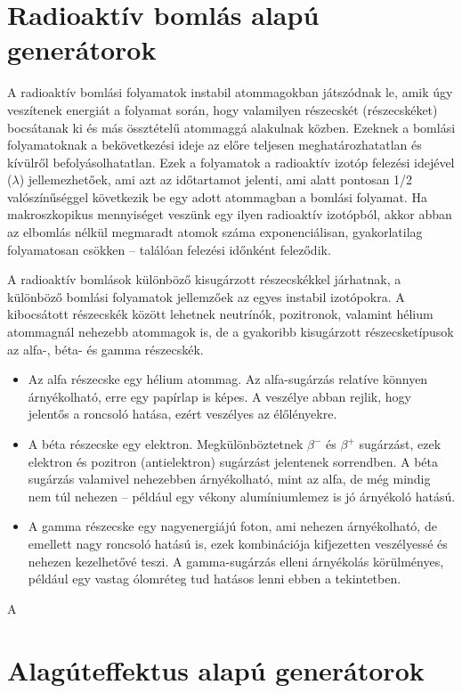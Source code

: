 \documentclass[12pt,a4paper,oneside]{article}
\begin{document}
\section*{Radioaktív bomlás alapú generátorok}
A  radioaktív bomlási folyamatok instabil atommagokban játszódnak le, amik úgy veszítenek energiát a folyamat során, hogy valamilyen részecskét (részecskéket) bocsátanak ki és más össztételű atommaggá alakulnak közben. Ezeknek a bomlási folyamatoknak a bekövetkezési ideje az előre teljesen meghatározhatatlan és kívülről befolyásolhatatlan. Ezek a folyamatok a radioaktív izotóp felezési idejével ($\lambda$) jellemezhetőek, ami azt az időtartamot jelenti, ami alatt pontosan 1/2 valószínűséggel következik be egy adott atommagban a bomlási folyamat. Ha makroszkopikus mennyiséget veszünk egy ilyen radioaktív izotópból, akkor abban az elbomlás nélkül megmaradt atomok száma exponenciálisan, gyakorlatilag folyamatosan csökken -- találóan felezési időnként feleződik.
\par
A radioaktív bomlások különböző kisugárzott részecskékkel járhatnak, a különböző bomlási folyamatok jellemzőek az egyes instabil izotópokra. A kibocsátott részecskék között lehetnek neutrínók, pozitronok, valamint hélium atommagnál nehezebb atommagok is, de a gyakoribb kisugárzott részecsketípusok az alfa-, béta- és gamma részecskék.
\begin{itemize}
	\item Az alfa részecske egy hélium atommag. Az alfa-sugárzás relatíve könnyen árnyékolható, erre egy papírlap is képes. A veszélye abban rejlik, hogy jelentős a roncsoló hatása, ezért veszélyes az élőlényekre.
	\item A béta részecske egy elektron. Megkülönböztetnek $\beta^-$ és $\beta^+$ sugárzást, ezek elektron és pozitron (antielektron) sugárzást jelentenek sorrendben. A béta sugárzás valamivel nehezebben árnyékolható, mint az alfa, de még mindig nem túl nehezen -- például egy vékony alumíniumlemez is jó árnyékoló hatású.
	\item A gamma részecske egy nagyenergiájú foton, ami nehezen árnyékolható, de emellett nagy roncsoló hatású is, ezek kombinációja kifjezetten veszélyessé és nehezen kezelhetővé teszi. A gamma-sugárzás elleni árnyékolás körülményes, például egy vastag ólomréteg tud hatásos lenni ebben a tekintetben.
\end{itemize}
\par
A
\section*{Alagúteffektus alapú generátorok}
\end{document}
